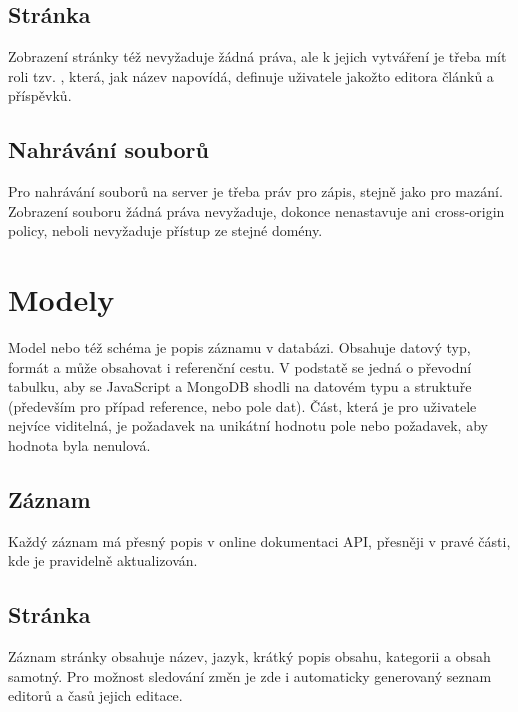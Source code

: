 \subsection{Stránka}
Zobrazení stránky též nevyžaduje žádná práva, ale k jejich vytváření je třeba mít roli tzv. , která,
jak název napovídá, definuje uživatele jakožto editora článků a příspěvků.

\subsection{Nahrávání souborů}
Pro nahrávání souborů na server je třeba práv pro zápis, stejně jako pro mazání.
Zobrazení souboru žádná práva nevyžaduje, dokonce nenastavuje ani cross-origin policy, neboli
nevyžaduje přístup ze stejné domény.

\section{Modely}
Model nebo též schéma je popis záznamu v databázi. Obsahuje datový typ, formát a může obsahovat i
referenční cestu. V podstatě se jedná o převodní tabulku, aby se JavaScript a MongoDB shodli na datovém typu a
struktuře (především pro případ reference, nebo pole dat). Část, která je pro uživatele nejvíce viditelná, je 
požadavek na unikátní hodnotu pole nebo požadavek, aby hodnota byla nenulová.
\subsection{Záznam} 
Každý záznam má přesný popis v online dokumentaci API, přesněji v pravé části, kde je pravidelně aktualizován.
\subsection{Stránka}
Záznam stránky obsahuje název, jazyk, krátký popis obsahu, kategorii a obsah samotný.
Pro možnost sledování změn je zde i automaticky generovaný seznam editorů a časů jejich editace.
